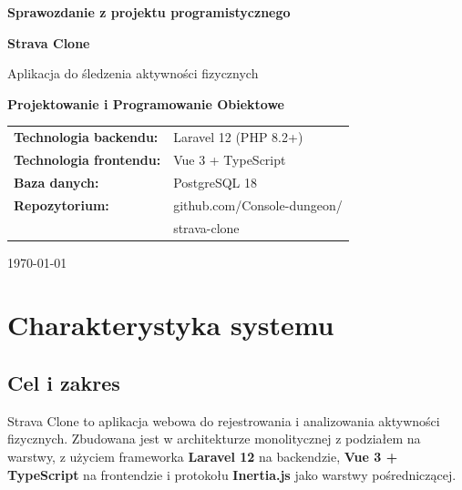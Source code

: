 \documentclass[12pt,a4paper]{report}
\begin{document}
\begin{titlepage}
    \centering
    \vspace*{2cm}

    {\LARGE\bfseries Sprawozdanie z projektu programistycznego\par}
    \vspace{1.5cm}

    {\Huge\bfseries Strava Clone\par}
    \vspace{0.5cm}
    {\large Aplikacja do śledzenia aktywności fizycznych\par}

    \vspace{1cm}
    {\large\bfseries Projektowanie i Programowanie Obiektowe\par}

    \vspace{1.5cm}

    \begin{tabular}{ll}
        \textbf{Technologia backendu:}  & Laravel 12 (PHP 8.2+)       \\[4pt]
        \textbf{Technologia frontendu:} & Vue 3 + TypeScript           \\[4pt]
        \textbf{Baza danych:}           & PostgreSQL 18                \\[4pt]
        \textbf{Repozytorium:}          & github.com/Console-dungeon/ \\
                                        & strava-clone                 \\
    \end{tabular}

    \vfill

    {\large \today\par}
\end{titlepage}

\tableofcontents
\thispagestyle{empty}
\cleardoublepage


\chapter{Charakterystyka systemu}
\label{ch:charakterystyka}

\section{Cel i zakres}

Strava Clone to aplikacja webowa do rejestrowania i analizowania aktywności fizycznych. Zbudowana jest w architekturze monolitycznej z podziałem na warstwy, z użyciem frameworka \textbf{Laravel 12} na backendzie, \textbf{Vue 3 + TypeScript} na frontendzie i protokołu \textbf{Inertia.js} jako warstwy pośredniczącej.
\end{document}
